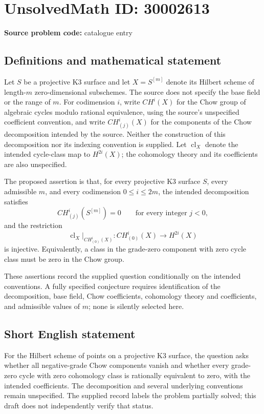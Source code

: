\documentclass[11pt]{article}
\begin{document}
\section*{UnsolvedMath ID: 30002613}
\textbf{Source problem code:} catalogue entry
\subsection{Definitions and mathematical statement}
Let \(S\) be a projective K3 surface and let \(X=S^{[m]}\) denote its Hilbert scheme of length-\(m\) zero-dimensional subschemes. The source does not specify the base field or the range of \(m\). For codimension \(i\), write \(CH^i(X)\) for the Chow group of algebraic cycles modulo rational equivalence, using the source's unspecified coefficient convention, and write \(CH^i_{(j)}(X)\) for the components of the Chow decomposition intended by the source. Neither the construction of this decomposition nor its indexing convention is supplied. Let \(\operatorname{cl}_X\) denote the intended cycle-class map to \(H^{2i}(X)\); the cohomology theory and its coefficients are also unspecified.

The proposed assertion is that, for every projective K3 surface \(S\), every admissible \(m\), and every codimension \(0\leq i\leq 2m\), the intended decomposition satisfies
\[
CH^i_{(j)}(S^{[m]})=0\qquad\text{for every integer }j<0,
\]
and the restriction
\[
\operatorname{cl}_X\big|_{CH^i_{(0)}(X)}:
CH^i_{(0)}(X)\longrightarrow H^{2i}(X)
\]
is injective. Equivalently, a class in the grade-zero component with zero cycle class must be zero in the Chow group.

These assertions record the supplied question conditionally on the intended conventions. A fully specified conjecture requires identification of the decomposition, base field, Chow coefficients, cohomology theory and coefficients, and admissible values of \(m\); none is silently selected here.
\subsection{Short English statement}
For the Hilbert scheme of points on a projective K3 surface, the question asks whether all negative-grade Chow components vanish and whether every grade-zero cycle with zero cohomology class is rationally equivalent to zero, with the intended coefficients. The decomposition and several underlying conventions remain unspecified. The supplied record labels the problem partially solved; this draft does not independently verify that status.
\end{document}
